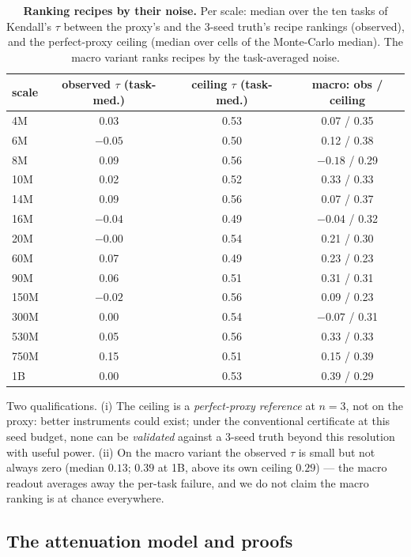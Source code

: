 \begin{table}[!htbp]
\centering
\caption{\textbf{Ranking recipes by their noise.} Per scale: median over the ten tasks of
Kendall's $\tau$ between the proxy's and the 3-seed truth's recipe rankings (observed), and
the perfect-proxy ceiling (median over cells of the Monte-Carlo median). The macro variant ranks
recipes by the task-averaged noise.}
\label{tab:t1-ranking}
\footnotesize
\begin{tabular}{@{}lccc@{}}
\toprule
scale & observed $\tau$ (task-med.) & ceiling $\tau$ (task-med.) & macro: obs / ceiling \\
\midrule
4M & 0.03 & 0.53 & 0.07 / 0.35 \\
6M & $-0.05$ & 0.50 & 0.12 / 0.38 \\
8M & 0.09 & 0.56 & $-0.18$ / 0.29 \\
10M & 0.02 & 0.52 & 0.33 / 0.33 \\
14M & 0.09 & 0.56 & 0.07 / 0.37 \\
16M & $-0.04$ & 0.49 & $-0.04$ / 0.32 \\
20M & $-0.00$ & 0.54 & 0.21 / 0.30 \\
60M & 0.07 & 0.49 & 0.23 / 0.23 \\
90M & 0.06 & 0.51 & 0.31 / 0.31 \\
150M & $-0.02$ & 0.56 & 0.09 / 0.23 \\
300M & 0.00 & 0.54 & $-0.07$ / 0.31 \\
530M & 0.05 & 0.56 & 0.33 / 0.33 \\
750M & 0.15 & 0.51 & 0.15 / 0.39 \\
1B & 0.00 & 0.53 & 0.39 / 0.29 \\
\bottomrule
\end{tabular}
\end{table}

Two qualifications. (i) The ceiling is a \emph{perfect-proxy reference} at $n = 3$, not on the proxy: better instruments could exist; under the conventional certificate at this seed budget, none can be \emph{validated} against a 3-seed truth beyond this resolution with useful power. (ii) On the macro
variant the observed $\tau$ is small but not always zero (median $0.13$; $0.39$ at 1B, above
its own ceiling $0.29$) --- the macro readout averages away the per-task failure, and we do
not claim the macro ranking is at chance everywhere.

\subsection{The attenuation model and proofs}
\label{app:t1-proof}

